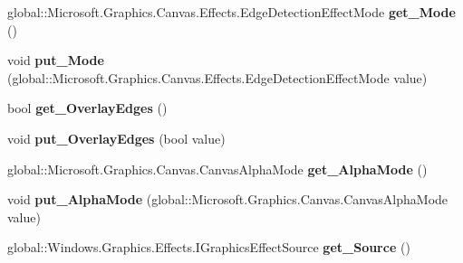 \begin{DoxyCompactItemize}
global\+::\+Microsoft.\+Graphics.\+Canvas.\+Effects.\+Edge\+Detection\+Effect\+Mode {\bfseries get\+\_\+\+Mode} ()
\item 
\mbox{\label{class_microsoft_1_1_graphics_1_1_canvas_1_1_effects_1_1_edge_detection_effect_a6f2ec4b23f0bd052e66ab4f0520145d5}} 
void {\bfseries put\+\_\+\+Mode} (global\+::\+Microsoft.\+Graphics.\+Canvas.\+Effects.\+Edge\+Detection\+Effect\+Mode value)
\item 
\mbox{\label{class_microsoft_1_1_graphics_1_1_canvas_1_1_effects_1_1_edge_detection_effect_a745adc8a87eda5967288647127125b99}} 
bool {\bfseries get\+\_\+\+Overlay\+Edges} ()
\item 
\mbox{\label{class_microsoft_1_1_graphics_1_1_canvas_1_1_effects_1_1_edge_detection_effect_aed02b04299f1e9aaa193a2836da03fb3}} 
void {\bfseries put\+\_\+\+Overlay\+Edges} (bool value)
\item 
\mbox{\label{class_microsoft_1_1_graphics_1_1_canvas_1_1_effects_1_1_edge_detection_effect_a807b89c06507ab3f180bd69e88b0868d}} 
global\+::\+Microsoft.\+Graphics.\+Canvas.\+Canvas\+Alpha\+Mode {\bfseries get\+\_\+\+Alpha\+Mode} ()
\item 
\mbox{\label{class_microsoft_1_1_graphics_1_1_canvas_1_1_effects_1_1_edge_detection_effect_a9a08543abae46a861e546beeb02a638c}} 
void {\bfseries put\+\_\+\+Alpha\+Mode} (global\+::\+Microsoft.\+Graphics.\+Canvas.\+Canvas\+Alpha\+Mode value)
\item 
\mbox{\label{class_microsoft_1_1_graphics_1_1_canvas_1_1_effects_1_1_edge_detection_effect_ac8fd2f7175d97d5cf3d30307d9f39bb1}} 
global\+::\+Windows.\+Graphics.\+Effects.\+I\+Graphics\+Effect\+Source {\bfseries get\+\_\+\+Source} ()
\item 
\mbox{\label{class_microsoft_1_1_graphics_1_1_canvas_1_1_effects_1_1_edge_detection_effect_aed3a83c6bc8c2c6a67cb52bca65aae15}} 

\end{DoxyCompactItemize}
